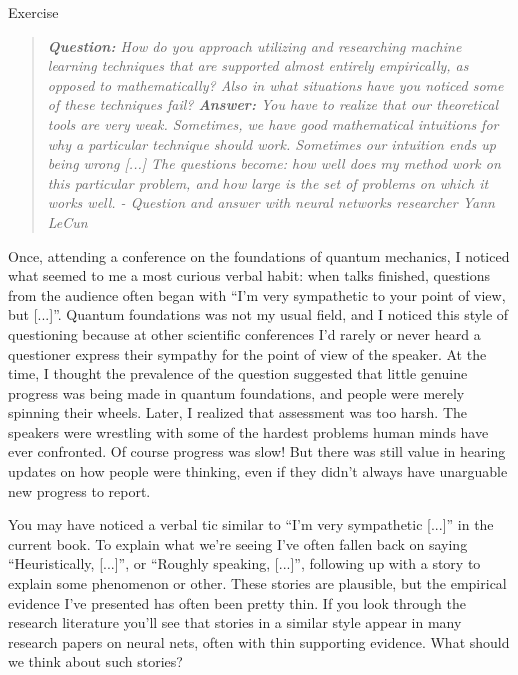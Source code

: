 \begin{exerciseBox}{Exercise}
\end{exerciseBox}






\begin{quote}
\emph{\textbf{Question:} How do you approach utilizing and researching machine learning techniques that are supported almost entirely empirically, as opposed to mathematically? Also in what situations have you noticed some of these techniques fail? \textbf{Answer:} You have to realize that our theoretical tools are very weak. Sometimes, we have good mathematical intuitions for why a particular technique should work. Sometimes our intuition ends up being wrong [...] The questions become: how well does my method work on this particular problem, and how large is the set of problems on which it works well. - Question and answer with neural networks researcher Yann LeCun}
\end{quote}


Once, attending a conference on the foundations of quantum mechanics, I noticed what seemed to me a most curious verbal habit: when talks finished, questions from the audience often began with ``I'm very sympathetic to your point of view, but [...]''. Quantum foundations was not my usual field, and I noticed this style of questioning because at other scientific conferences I'd rarely or never heard a questioner express their sympathy for the point of view of the speaker. At the time, I thought the prevalence of the question suggested that little genuine progress was being made in quantum foundations, and people were merely spinning their wheels. Later, I realized that assessment was too harsh. The speakers were wrestling with some of the hardest problems human minds have ever confronted. Of course progress was slow! But there was still value in hearing updates on how people were thinking, even if they didn't always have unarguable new progress to report.


You may have noticed a verbal tic similar to ``I'm very sympathetic [...]'' in the current book. To explain what we're seeing I've often fallen back on saying ``Heuristically, [...]'', or ``Roughly speaking, [...]'', following up with a story to explain some phenomenon or other. These stories are plausible, but the empirical evidence I've presented has often been pretty thin. If you look through the research literature you'll see that stories in a similar style appear in many research papers on neural nets, often with thin supporting evidence. What should we think about such stories?


